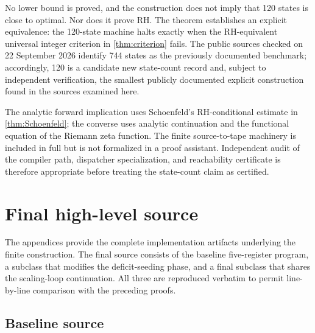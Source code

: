 \documentclass[10pt]{article}
\theoremstyle{definition}
\begin{document}
No lower bound is proved, and the construction does not imply that 120 states
is close to optimal. Nor does it prove RH. The theorem establishes an explicit
equivalence: the 120-state machine halts exactly when the RH-equivalent
universal integer criterion in \cref{thm:criterion} fails. The public sources
checked on 22 September 2026 identify 744 states as the previously documented
benchmark; accordingly, 120 is a candidate new state-count record and, subject
to independent verification, the smallest publicly documented explicit
construction found in the sources examined here.

The analytic forward implication uses Schoenfeld's RH-conditional estimate in
\cref{thm:Schoenfeld}; the converse uses analytic continuation and the
functional equation of the Riemann zeta function. The finite source-to-tape
machinery is included in full but is not formalized in a proof assistant.
Independent audit of the compiler path, dispatcher specialization, and
reachability certificate is therefore appropriate before treating the
state-count claim as certified.

\appendix
\clearpage
\section{Final high-level source}
\label{app:source}

The appendices provide the complete implementation artifacts underlying the
finite construction. The final source consists of the baseline five-register
program, a subclass that modifies the deficit-seeding phase, and a final
subclass that shares the scaling-loop continuation. All three are reproduced verbatim to permit line-by-line comparison with the preceding
proofs.

\subsection{Baseline source}
\end{document}
